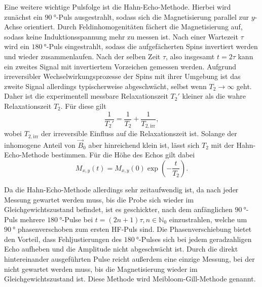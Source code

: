Eine weitere wichtige Pulsfolge ist die Hahn-Echo-Methode. Hierbei wird zunächst ein $\SI{90}{\degree}$-Puls ausgestrahlt, sodass sich die Magnetisierung parallel zur $y$-Achse orientiert. Durch Feldinhomogenitäten fächert die Magnetisierung auf, sodass keine Induktionsspannung mehr zu messen ist. Nach einer Wartezeit $\tau$ wird ein $\SI{180}{\degree}$-Puls eingestrahlt, sodass die aufgefächerten Spins invertiert werden und wieder zusammenlaufen. Nach der selben Zeit $\tau$, also insgesamt $t = 2\tau$ kann ein zweites Signal mit invertiertem Vorzeichen gemessen werden. Aufgrund irreversibler Wechselwirkungsprozesse der Spins mit ihrer Umgebung ist das zweite Signal allerdings typischerweise abgeschwächt, selbst wenn $T_2 \rightarrow \infty$ geht. Daher ist die experimentell messbare Relaxationszeit $T_2'$ kleiner als die wahre Relaxationszeit $T_2$. Für diese gilt
\begin{equation*}
  \frac{1}{T_2'} = \frac{1}{T_2} + \frac{1}{T_{2,\mathrm{irr}}},
\end{equation*}
wobei $T_{2,\mathrm{irr}}$ der irreversible Einfluss auf die Relaxationszeit ist. Solange der inhomogene Anteil von $\vec{B}_0$ aber hinreichend klein ist, lässt sich $T_2$ mit der Hahn-Echo-Methode bestimmen. Für die Höhe des Echos gilt dabei
\begin{equation}
  M_{x,y} \left(t\right) = M_{x,y} \left(0\right) \exp \left(-\frac{t}{T_2}\right).
  \label{eq:T2}
\end{equation}

Da die Hahn-Echo-Methode allerdings sehr zeitaufwendig ist, da nach jeder Messung gewartet werden muss, bis die Probe sich wieder im Gleichgewichtszustand befindet, ist es geschickter, nach dem anfänglichen $\SI{90}{\degree}$-Puls mehrere $\SI{180}{\degree}$-Pulse bei $t = (2n+1)\tau, n \in \mathbb{N}_0$ einzustrahlen, welche um $\SI{90}{\degree}$ phasenverschoben zum ersten HF-Puls sind. Die Phasenverschiebung bietet den Vorteil, dass Fehljustierungen des $\SI{180}{\degree}$-Pulses sich bei jedem geradzahligen Echo aufheben und die Amplitude nicht abgeschwächt ist. Durch die direkt hintereinander ausgeführten Pulse reicht außerdem eine einzige Messung, bei der nicht gewartet werden muss, bis die Magnetisierung wieder im Gleichgewichtszustand ist. Diese Methode wird Meibloom-Gill-Methode genannt.

